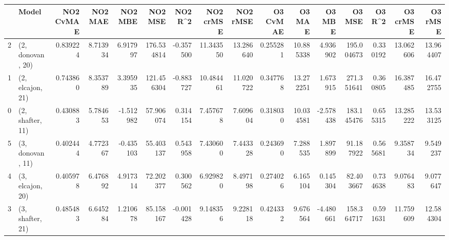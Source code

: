 \begin{tabular}{llrrrrrrrrrrrrrr}
\toprule
{} &             Model &  NO2 CvMAE &   NO2 MAE &   NO2 MBE &     NO2 MSE &   NO2 R\textasciicircum2 &  NO2 crMSE &   NO2 rMSE &  O3 CvMAE &     O3 MAE &    O3 MBE &      O3 MSE &    O3 R\textasciicircum2 &   O3 crMSE &    O3 rMSE \\
\midrule
2 &  (2, donovan, 20) &   0.839224 &  8.713934 &  6.917997 &  176.534814 & -0.357500 &  11.343550 &  13.286640 &  0.255281 &  10.885338 &  4.936902 &  195.004673 &  0.330192 &  13.062606 &  13.964407 \\
1 &  (2, elcajon, 21) &   0.743860 &  8.353789 &  3.395935 &  121.456304 & -0.883727 &  10.484461 &  11.020722 &  0.347768 &  13.272251 &  1.673915 &  271.351641 &  0.360805 &  16.387485 &  16.472755 \\
0 &  (2, shafter, 11) &   0.430883 &  5.784653 & -1.512982 &   57.906074 &  0.314154 &   7.457678 &   7.609604 &  0.318030 &  10.034581 & -2.578438 &  183.145476 &  0.655315 &  13.285222 &  13.533125 \\
5 &  (3, donovan, 11) &   0.402444 &  4.772367 & -0.435103 &   55.403137 &  0.543958 &   7.430600 &   7.443328 &  0.243690 &   7.288535 &  1.897899 &   91.187922 &  0.565681 &   9.358734 &   9.549237 \\
4 &  (3, elcajon, 20) &   0.405978 &  6.476892 &  4.917314 &   72.202377 &  0.300562 &   6.929820 &   8.497198 &  0.274026 &   6.165104 &  0.145304 &   82.403667 &  0.734638 &   9.076483 &   9.077647 \\
3 &  (3, shafter, 21) &   0.485483 &  6.645284 &  1.210678 &   85.158167 & -0.001428 &   9.148356 &   9.228118 &  0.424332 &   9.676564 & -4.480661 &  158.364717 &  0.591631 &  11.759609 &  12.584304 \\
\bottomrule
\end{tabular}
